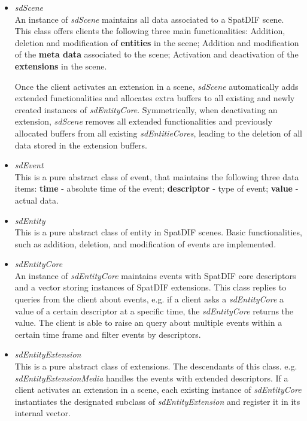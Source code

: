 \documentclass{article}
\begin{document}
\begin{itemize}[leftmargin=-0.0mm]
\item[] \emph{sdScene}\\
An instance of \emph{sdScene} maintains all data associated to a SpatDIF scene. This class offers clients the following three main functionalities: Addition, deletion and modification of \textbf{entities} in the scene; Addition and modification of the \textbf{meta data} associated to the scene; Activation and deactivation of the \textbf{extensions} in the scene.

Once the client activates an extension in a scene, \emph{sdScene} automatically adds extended functionalities and allocates extra buffers to all existing and newly created instances of \emph{sdEntityCore}. 
Symmetrically, when deactivating an extension, \emph{sdScene} removes all extended functionalities and previously allocated buffers from all existing \emph{sdEntitieCores}, leading to the deletion of all data stored in the extension buffers.

\item[] \emph{sdEvent}\\
This is a pure abstract class of event, that maintains the following three data items: \textbf{time} - absolute time of the event; \textbf{descriptor} - type of event; \textbf{value} - actual data.

\item[] \emph{sdEntity}\\
This is a pure abstract class of entity in SpatDIF scenes. Basic functionalities, such as addition, deletion, and modification of events are implemented.

\item[] \emph{sdEntityCore}\\
An instance of \emph{sdEntityCore} maintains events with SpatDIF core descriptors and a vector storing instances of SpatDIF extensions. 
This class replies to queries from the client about events, e.g. if a client asks a \emph{sdEntityCore} a value of a certain descriptor at a specific time, the \emph{sdEntityCore} returns the value. 
The client is able to raise an query about multiple events within a certain time frame and filter events by descriptors. 

\item[] \emph{sdEntityExtension}\\
This is a pure abstract class of extensions. The descendants of this class. e.g. \emph{sdEntityExtensionMedia} handles the events with extended descriptors. 
If a client activates an extension in a scene, each existing instance of \emph{sdEntityCore} instantiates the designated subclass of \emph{sdEntityExtension} and register it in its internal vector.


\end{itemize}
\end{document}
